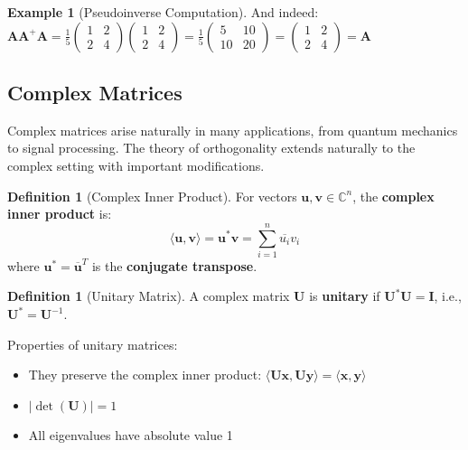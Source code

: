 \documentclass[12pt]{article}
\numberwithin{equation}{section}
\newcommand{\vect}[1]{\boldsymbol{#1}}   %
\newcommand{\mat}[1]{\mathbf{#1}}        %
\theoremstyle{plain}
\theoremstyle{definition}
\newtheorem{definition}[theorem]{Definition}
\newtheorem{example}[theorem]{Example}
\theoremstyle{remark}
\begin{document}
\begin{example}[Pseudoinverse Computation]
And indeed: $\mat{A}\mat{A}^+\mat{A} = \frac{1}{5}\begin{pmatrix} 1 & 2 \\ 2 & 4 \end{pmatrix}\begin{pmatrix} 1 & 2 \\ 2 & 4 \end{pmatrix} = \frac{1}{5}\begin{pmatrix} 5 & 10 \\ 10 & 20 \end{pmatrix} = \begin{pmatrix} 1 & 2 \\ 2 & 4 \end{pmatrix} = \mat{A}$ \checkmark
\end{example}

\subsection{Complex Matrices}

Complex matrices arise naturally in many applications, from quantum mechanics to signal processing. The theory of orthogonality extends naturally to the complex setting with important modifications.

\begin{definition}[Complex Inner Product]
For vectors $\vect{u}, \vect{v} \in \mathbb{C}^n$, the \textbf{complex inner product} is:
$$\langle \vect{u}, \vect{v} \rangle = \vect{u}^*\vect{v} = \sum_{i=1}^n \overline{u_i}v_i$$
where $\vect{u}^* = \overline{\vect{u}}^T$ is the \textbf{conjugate transpose}.
\end{definition}

\begin{definition}[Unitary Matrix]
A complex matrix $\mat{U}$ is \textbf{unitary} if $\mat{U}^*\mat{U} = \mat{I}$, i.e., $\mat{U}^* = \mat{U}^{-1}$.

Properties of unitary matrices:
\begin{itemize}
\item They preserve the complex inner product: $\langle \mat{U}\vect{x}, \mat{U}\vect{y} \rangle = \langle \vect{x}, \vect{y} \rangle$
\item $|\det(\mat{U})| = 1$
\item All eigenvalues have absolute value 1
\end{itemize}
\end{definition}
\end{document}
